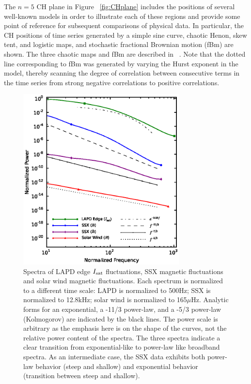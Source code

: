 \documentclass[aps,prx,twocolumn,secnumarabic,nobalancelastpage,amsmath,amssymb,
nofootinbib]{revtex4-1}
\begin{document}
The $n=5$ CH plane in Figure ~\ref{fig:CHplane} includes the positions of several well-known models in order to illustrate each of these regions and provide some point of reference for subsequent comparisons of physical data. In particular, the CH positions of time series generated by a simple sine curve, chaotic Henon, skew tent, and logistic maps, and stochastic fractional Brownian motion (fBm) are shown. The three chaotic maps and fBm are described in ~\cite{rosso2007}. Note that the dotted line corresponding to fBm was generated by varying the Hurst exponent in the model, thereby scanning the degree of correlation between consecutive terms in the time series from strong negative correlations to positive correlations.
%
\begin{figure}[!htbp]
\centerline{
\includegraphics[width=8.5cm]{figure2.eps}}
\caption{\label{fig:spectra} Spectra of LAPD edge $I_{\rm sat}$ fluctuations, SSX magnetic fluctuations and solar wind magnetic fluctuations. Each spectrum is normalized to a different time scale: LAPD is normalized to 500Hz; SSX is normalized to 12.8kHz; solar wind is normalized to 165$\mu$Hz. Analytic forms for an exponential, a -11/3 power-law, and a -5/3 power-law (Kolmogorov) are indicated by the black lines. The power scale is arbitrary as the emphasis here is on the shape of the curves, not the relative power content of the spectra. The three spectra indicate a clear transition from exponential-like to power-law like broadband spectra. As an intermediate case, the SSX data exhibits both power-law behavior (steep and shallow) and exponential behavior (transition between steep and shallow).}
\end{figure}
%
\end{document}
